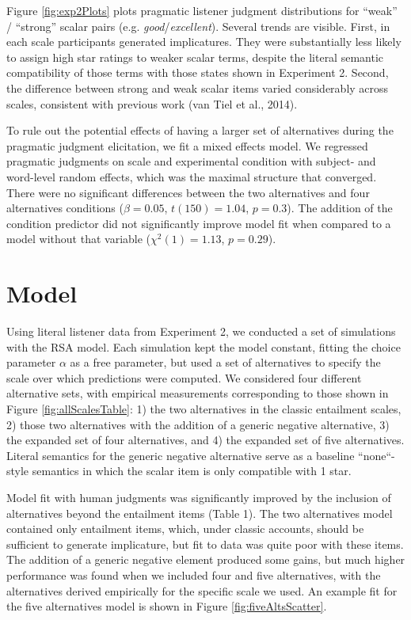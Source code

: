\documentclass[10pt, letterpaper]{article}
\begin{document}
Figure \ref{fig:exp2Plots} plots pragmatic listener judgment
distributions for ``weak'' / ``strong'' scalar pairs (e.g.
\emph{good}/\emph{excellent}). Several trends are visible. First, in
each scale participants generated implicatures. They were substantially
less likely to assign high star ratings to weaker scalar terms, despite
the literal semantic compatibility of those terms with those states
shown in Experiment 2. Second, the difference between strong and weak
scalar items varied considerably across scales, consistent with previous
work ({van Tiel} et al., 2014).

To rule out the potential effects of having a larger set of alternatives
during the pragmatic judgment elicitation, we fit a mixed effects model.
We regressed pragmatic judgments on scale and experimental condition
with subject- and word-level random effects, which was the maximal
structure that converged. There were no significant differences between
the two alternatives and four alternatives conditions (\(\beta = 0.05\),
\(t(150) = 1.04\), \(p = 0.3\)). The addition of the condition predictor
did not significantly improve model fit when compared to a model without
that variable (\(\chi^2(1) = 1.13\), \(p = 0.29\)).

\section{Model}\label{model}

Using literal listener data from Experiment 2, we conducted a set of
simulations with the RSA model. Each simulation kept the model constant,
fitting the choice parameter \(\alpha\) as a free parameter, but used a
set of alternatives to specify the scale over which predictions were
computed. We considered four different alternative sets, with empirical
measurements corresponding to those shown in Figure
\ref{fig:allScalesTable}: 1) the two alternatives in the classic
entailment scales, 2) those two alternatives with the addition of a
generic negative alternative, 3) the expanded set of four alternatives,
and 4) the expanded set of five alternatives. Literal semantics for the
generic negative alternative serve as a baseline ``none``-style
semantics in which the scalar item is only compatible with 1 star.

Model fit with human judgments was significantly improved by the
inclusion of alternatives beyond the entailment items (Table 1). The two
alternatives model contained only entailment items, which, under classic
accounts, should be sufficient to generate implicature, but fit to data
was quite poor with these items. The addition of a generic negative
element produced some gains, but much higher performance was found when
we included four and five alternatives, with the alternatives derived
empirically for the specific scale we used. An example fit for the five
alternatives model is shown in Figure \ref{fig:fiveAltsScatter}.
\end{document}
